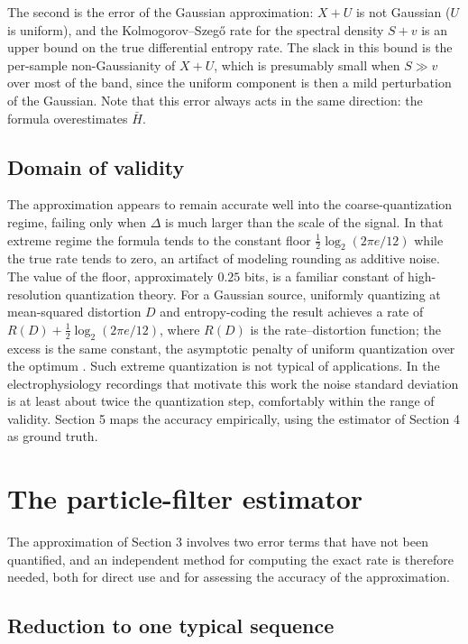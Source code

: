 \documentclass[11pt]{article}
\begin{document}
The second is the error of the Gaussian approximation: \(X + U\) is not Gaussian (\(U\) is uniform), and the Kolmogorov--Szegő rate for the spectral density \(S + v\) is an upper bound on the true differential entropy rate. The slack in this bound is the per-sample non-Gaussianity of \(X + U\), which is presumably small when \(S \gg v\) over most of the band, since the uniform component is then a mild perturbation of the Gaussian. Note that this error always acts in the same direction: the formula overestimates \(\bar H\).

\subsection{Domain of validity}\label{domain-of-validity}

The approximation appears to remain accurate well into the coarse-quantization regime, failing only when \(\Delta\) is much larger than the scale of the signal. In that extreme regime the formula tends to the constant floor \(\tfrac12\log_2(2\pi e/12)\) while the true rate tends to zero, an artifact of modeling rounding as additive noise. The value of the floor, approximately \(0.25\) bits, is a familiar constant of high-resolution quantization theory. For a Gaussian source, uniformly quantizing at mean-squared distortion \(D\) and entropy-coding the result achieves a rate of \(R(D) + \tfrac12\log_2(2\pi e/12)\), where \(R(D)\) is the rate--distortion function; the excess is the same constant, the asymptotic penalty of uniform quantization over the optimum \cite{GrayNeuhoff1998,GishPierce1968}. Such extreme quantization is not typical of applications. In the electrophysiology recordings that motivate this work the noise standard deviation is at least about twice the quantization step, comfortably within the range of validity. Section 5 maps the accuracy empirically, using the estimator of Section 4 as ground truth.

\section{The particle-filter estimator}\label{the-particle-filter-estimator}

The approximation of Section 3 involves two error terms that have not been quantified, and an independent method for computing the exact rate is therefore needed, both for direct use and for assessing the accuracy of the approximation.

\subsection{Reduction to one typical sequence}\label{reduction-to-one-typical-sequence}
\end{document}
